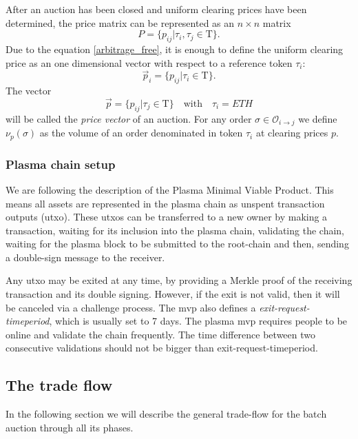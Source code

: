\documentclass[11pt,parskip=full]{scrartcl}%
\newcommand{\Tau}{\mathrm{T}}
\def\pO{\mathcal{O}}
\def\ra{\rightarrow}
\begin{document}
After an auction has been closed and uniform clearing prices have been determined, the price matrix can be represented as an $n\times n$ matrix 
\[P = \{p_{ij}| \tau_i, \tau_j \in \Tau \}.\]
Due to the equation \ref{arbitrage_free}, it is enough to define the uniform clearing price as an one dimensional vector with respect to a reference token $\tau_i$:
\[ \vec{p}_i = \{p_{ij}| \tau_i \in \Tau \}.\]
The vector
\begin{equation}
\vec{p} =\{ p_{ij}| \tau_j \in \Tau \} \quad \text{with} \quad \tau_i =ETH
\label{pricevector}
\end{equation}
will be called the \emph{price vector} of an auction.\newline
For any order $\sigma \in \pO_{i\ra j}$ we define $\nu_p(\sigma)$ as the volume of an order denominated in token $\tau_i$ at clearing prices $p$.


\subsubsection{Plasma chain setup}
We are following the description of the Plasma Minimal Viable Product\cite{MVP}. 
This means all assets are represented in the plasma chain as unspent transaction outputs (utxo). 
These utxos can be transferred to a new owner by making a transaction, waiting for its inclusion into the plasma chain, validating the chain, waiting for the plasma block to be submitted to the root-chain and then, sending a double-sign message to the receiver. 

Any utxo may be exited at any time, by providing a Merkle proof of the receiving transaction and its double signing. 
However, if the exit is not valid, then it will be canceled via a challenge process.
The mvp also defines a \emph{exit-request-timeperiod}\label{exit-time}, which is usually set to 7 days. The plasma mvp requires people to be online and validate the chain frequently.
The time difference between two consecutive validations should not be bigger than exit-request-timeperiod.


\subsection{The trade flow}
\label{subsec:data}

In the following section we will describe the general trade-flow for the batch auction through all its phases.
\end{document}
